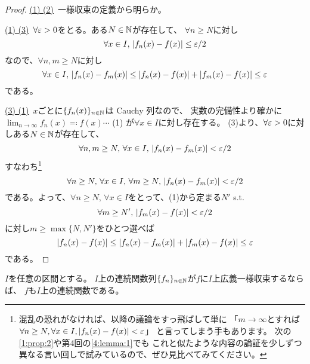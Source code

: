 \documentclass[report]{jlreq}
\begin{document}
\begin{proof}
    \underline{(1) \Leftrightarrow (2)}\, 一様収束の定義から明らか。

    \underline{(1) \Rightarrow (3)}\,
    $\forall \varepsilon > 0$をとる。ある$N \in \mathbb{N}$が存在して、
    $\forall n \ge N$に対し
    \begin{equation}
        \forall x \in I,\, |f_n(x) - f(x)| \le \varepsilon / 2
    \end{equation}
    なので、$\forall n, m \ge N$に対し
    \begin{equation}
        \forall x \in I,\, |f_n(x) - f_m(x)| \le |f_n(x) - f(x)| + |f_m(x) - f(x)| \le \varepsilon
    \end{equation}
    である。

    \underline{(3) \Rightarrow (1)}\,
    $x$ごとに$\{ f_n(x) \}_{n \in \mathbb{N}}$は Cauchy 列なので、
    実数の完備性より確かに
    $\lim_{n \to \infty} f_n(x) \eqqcolon f(x) \cdots$ (1) が$\forall x \in I$に対し存在する。
    (3)より、$\forall \varepsilon > 0$に対しある$N \in \mathbb{N}$が存在して、
    \begin{equation}
        \forall n, m \ge N,\, \forall x \in I,\, |f_n(x) - f_m(x)| < \varepsilon / 2
    \end{equation}
    すなわち\footnote{
        混乱の恐れがなければ、以降の議論をすっ飛ばして単に
        「$m \to \infty$とすれば$\forall n \ge N, \forall x \in I, |f_n(x) - f(x)| < \varepsilon$」
        と言ってしまう手もあります。
        次の\cref{1:prop:2}や第4回の\cref{4:lemma:1}でも
        これと似たような内容の論証を少しずつ異なる言い回しで試みているので、ぜひ見比べてみてください。
    }
    \begin{equation}
        \forall n \ge N,\, \forall x \in I,\, \forall m \ge N,\, |f_n(x) - f_m(x)| < \varepsilon / 2
    \end{equation}
    である。よって、$\forall n \ge N,\, \forall x \in I$をとって、(1)から定まる$N'$ s.t.
    \begin{equation}
        \forall m \ge N',\, |f_m(x) - f(x)| < \varepsilon / 2
    \end{equation}
    に対し$m \ge \max\{N, N'\}$をひとつ選べば
    \begin{equation}
        |f_n(x) - f(x)| \le |f_n(x) - f_m(x)| + |f_m(x) - f(x)| \le \varepsilon
    \end{equation}
    である。
\end{proof}

\begin{proposition}
    $I$を任意の区間とする。
    $I$上の連続関数列$\{ f_n \}_{n \in \mathbb{N}}$が$f$に$I$上広義一様収束するならば、
    $f$も$I$上の連続関数である。
    \label{1:prop:2}
\end{proposition}
\end{document}
